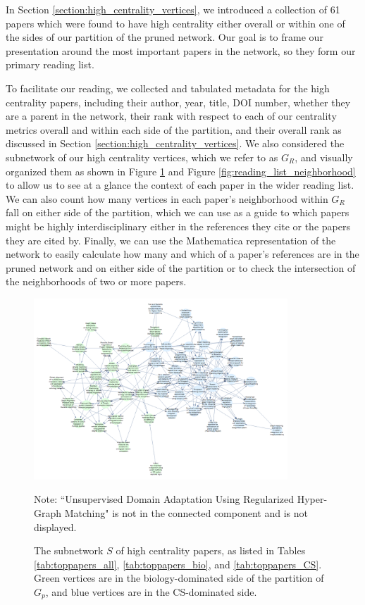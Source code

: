 \documentclass[12pt]{thesis}
\theoremstyle{plain}
\theoremstyle{definition}
\theoremstyle{remark}
\begin{document}
In Section \ref{section:high_centrality_vertices}, we introduced a collection of 61 papers which were found to have high centrality either overall or within one of the sides of our partition of the pruned network. Our goal is to frame our presentation around the most important papers in the network, so they form our primary reading list. 

To facilitate our reading, we collected and tabulated metadata for the high centrality papers, including their author, year, title, DOI number, whether they are a parent in the network, their rank with respect to each of our centrality metrics overall and within each side of the partition, and their overall rank as discussed in Section \ref{section:high_centrality_vertices}. We also considered the subnetwork of our high centrality vertices, which we refer to as $G_R$, and visually organized them as shown in Figure \ref{fig:reading_list} and Figure \ref{fig:reading_list_neighborhood} to allow us to see at a glance the context of each paper in the wider reading list. We can also count how many vertices in each paper's neighborhood within $G_R$ fall on either side of the partition, which we can use as a guide to which papers might be highly interdisciplinary either in the references they cite or the papers they are cited by. Finally, we can use the Mathematica representation of the network to easily calculate how many and which of a paper's references are in the pruned network and on either side of the partition or to check the intersection of the neighborhoods of two or more papers.

\begin{figure}
\centering
\includegraphics[width=0.85\textwidth]{reading_list0pt9crop.png}
\caption{The subnetwork $S$ of high centrality papers, as listed in Tables \ref{tab:toppapers_all}, \ref{tab:toppapers_bio}, and \ref{tab:toppapers_CS}. Green vertices are in the biology-dominated side of the partition of $G_p$, and blue vertices are in the CS-dominated side.}
\vspace{-12pt}\flushleft\scriptsize Note: ``Unsupervised Domain Adaptation Using Regularized Hyper-Graph Matching" is not in the connected component and is not displayed.
\label{fig:reading_list}
\end{figure}
\end{document}
